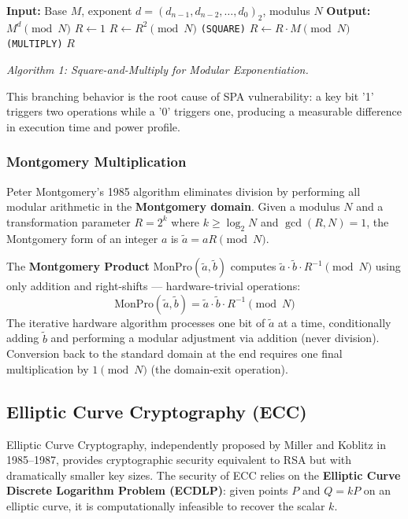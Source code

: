 \documentclass[conference, a4paper]{IEEEtran}
\begin{document}
\begin{algorithmic}
\STATE \textbf{Input:} Base $M$, exponent $d = (d_{n-1}, d_{n-2}, \ldots, d_0)_2$, modulus $N$
\STATE \textbf{Output:} $M^d \pmod{N}$
\STATE $R \leftarrow 1$
    \STATE $R \leftarrow R^2 \pmod{N}$ \hfill \texttt{(SQUARE)}
        \STATE $R \leftarrow R \cdot M \pmod{N}$ \hfill \texttt{(MULTIPLY)}
    \ENDIF
\ENDFOR
\RETURN $R$
\end{algorithmic}
\vspace{2pt}
\textit{Algorithm 1: Square-and-Multiply for Modular Exponentiation.}
\vspace{4pt}

This branching behavior is the root cause of SPA vulnerability: a key bit '1' triggers two operations while a '0' triggers one, producing a measurable difference in execution time and power profile.

\subsubsection*{Montgomery Multiplication}
Peter Montgomery's 1985 algorithm \cite{b2} eliminates division by performing all modular arithmetic in the \textbf{Montgomery domain}. Given a modulus $N$ and a transformation parameter $R = 2^k$ where $k \geq \log_2 N$ and $\gcd(R, N) = 1$, the Montgomery form of an integer $a$ is $\tilde{a} = aR \pmod{N}$.

The \textbf{Montgomery Product} $\text{MonPro}(\tilde{a}, \tilde{b})$ computes $\tilde{a} \cdot \tilde{b} \cdot R^{-1} \pmod{N}$ using only addition and right-shifts — hardware-trivial operations:
\begin{equation}
    \text{MonPro}(\tilde{a}, \tilde{b}) = \tilde{a} \cdot \tilde{b} \cdot R^{-1} \pmod{N}
\end{equation}
The iterative hardware algorithm processes one bit of $\tilde{a}$ at a time, conditionally adding $\tilde{b}$ and performing a modular adjustment via addition (never division). Conversion back to the standard domain at the end requires one final multiplication by $1 \pmod{N}$ (the domain-exit operation).

\subsection{Elliptic Curve Cryptography (ECC)}

Elliptic Curve Cryptography, independently proposed by Miller \cite{b7} and Koblitz \cite{b4} in 1985--1987, provides cryptographic security equivalent to RSA but with dramatically smaller key sizes. The security of ECC relies on the \textbf{Elliptic Curve Discrete Logarithm Problem (ECDLP)}: given points $P$ and $Q = kP$ on an elliptic curve, it is computationally infeasible to recover the scalar $k$.
\end{document}

